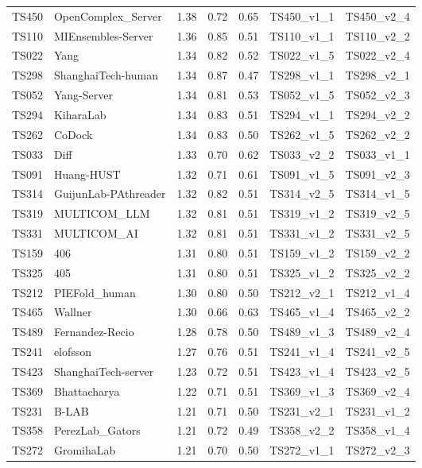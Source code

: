 \begin{longtable}{lllllll}
TS450 & OpenComplex\_Server & 1.38 & 0.72 & 0.65 & TS450\_v1\_1 & TS450\_v2\_4 \\ 
TS110 & MIEnsembles-Server & 1.36 & 0.85 & 0.51 & TS110\_v1\_1 & TS110\_v2\_2 \\ 
TS022 & Yang & 1.34 & 0.82 & 0.52 & TS022\_v1\_5 & TS022\_v2\_4 \\ 
TS298 & ShanghaiTech-human & 1.34 & 0.87 & 0.47 & TS298\_v1\_1 & TS298\_v2\_1 \\ 
TS052 & Yang-Server & 1.34 & 0.81 & 0.53 & TS052\_v1\_5 & TS052\_v2\_3 \\ 
TS294 & KiharaLab & 1.34 & 0.83 & 0.51 & TS294\_v1\_1 & TS294\_v2\_2 \\ 
TS262 & CoDock & 1.34 & 0.83 & 0.50 & TS262\_v1\_5 & TS262\_v2\_2 \\ 
TS033 & Diff & 1.33 & 0.70 & 0.62 & TS033\_v2\_2 & TS033\_v1\_1 \\ 
TS091 & Huang-HUST & 1.32 & 0.71 & 0.61 & TS091\_v1\_5 & TS091\_v2\_3 \\ 
TS314 & GuijunLab-PAthreader & 1.32 & 0.82 & 0.51 & TS314\_v2\_5 & TS314\_v1\_5 \\ 
TS319 & MULTICOM\_LLM & 1.32 & 0.81 & 0.51 & TS319\_v1\_2 & TS319\_v2\_5 \\ 
TS331 & MULTICOM\_AI & 1.32 & 0.81 & 0.51 & TS331\_v1\_2 & TS331\_v2\_5 \\ 
TS159 & 406 & 1.31 & 0.80 & 0.51 & TS159\_v1\_2 & TS159\_v2\_2 \\ 
TS325 & 405 & 1.31 & 0.80 & 0.51 & TS325\_v1\_2 & TS325\_v2\_2 \\ 
TS212 & PIEFold\_human & 1.30 & 0.80 & 0.50 & TS212\_v2\_1 & TS212\_v1\_4 \\ 
TS465 & Wallner & 1.30 & 0.66 & 0.63 & TS465\_v1\_4 & TS465\_v2\_2 \\ 
TS489 & Fernandez-Recio & 1.28 & 0.78 & 0.50 & TS489\_v1\_3 & TS489\_v2\_4 \\ 
TS241 & elofsson & 1.27 & 0.76 & 0.51 & TS241\_v1\_4 & TS241\_v2\_5 \\ 
TS423 & ShanghaiTech-server & 1.23 & 0.72 & 0.51 & TS423\_v1\_4 & TS423\_v2\_5 \\ 
TS369 & Bhattacharya & 1.22 & 0.71 & 0.51 & TS369\_v1\_3 & TS369\_v2\_4 \\ 
TS231 & B-LAB & 1.21 & 0.71 & 0.50 & TS231\_v2\_1 & TS231\_v1\_2 \\ 
TS358 & PerezLab\_Gators & 1.21 & 0.72 & 0.49 & TS358\_v2\_2 & TS358\_v1\_4 \\ 
TS272 & GromihaLab & 1.21 & 0.70 & 0.50 & TS272\_v1\_1 & TS272\_v2\_3 \\ 

\end{longtable}

